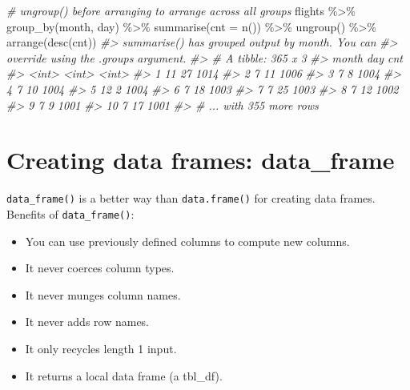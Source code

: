 \documentclass[
]{book}
\newenvironment{Shaded}{\begin{snugshade}}{\end{snugshade}}
\newcommand{\AttributeTok}[1]{\textcolor[rgb]{0.77,0.63,0.00}{#1}}
\newcommand{\CommentTok}[1]{\textcolor[rgb]{0.56,0.35,0.01}{\textit{#1}}}
\newcommand{\FunctionTok}[1]{\textcolor[rgb]{0.00,0.00,0.00}{#1}}
\newcommand{\NormalTok}[1]{#1}
\newcommand{\SpecialCharTok}[1]{\textcolor[rgb]{0.00,0.00,0.00}{#1}}
\providecommand{\tightlist}{%
  \setlength{\itemsep}{0pt}\setlength{\parskip}{0pt}}
\begin{document}
\begin{Shaded}
\begin{Highlighting}[]
\CommentTok{\# ungroup() before arranging to arrange across all groups}
\NormalTok{flights }\SpecialCharTok{\%\textgreater{}\%} \FunctionTok{group\_by}\NormalTok{(month, day) }\SpecialCharTok{\%\textgreater{}\%} \FunctionTok{summarise}\NormalTok{(}\AttributeTok{cnt =} \FunctionTok{n}\NormalTok{()) }\SpecialCharTok{\%\textgreater{}\%} \FunctionTok{ungroup}\NormalTok{() }\SpecialCharTok{\%\textgreater{}\%} \FunctionTok{arrange}\NormalTok{(}\FunctionTok{desc}\NormalTok{(cnt))}
\CommentTok{\#\textgreater{} \textasciigrave{}summarise()\textasciigrave{} has grouped output by \textquotesingle{}month\textquotesingle{}. You can}
\CommentTok{\#\textgreater{} override using the \textasciigrave{}.groups\textasciigrave{} argument.}
\CommentTok{\#\textgreater{} \# A tibble: 365 x 3}
\CommentTok{\#\textgreater{}    month   day   cnt}
\CommentTok{\#\textgreater{}    \textless{}int\textgreater{} \textless{}int\textgreater{} \textless{}int\textgreater{}}
\CommentTok{\#\textgreater{}  1    11    27  1014}
\CommentTok{\#\textgreater{}  2     7    11  1006}
\CommentTok{\#\textgreater{}  3     7     8  1004}
\CommentTok{\#\textgreater{}  4     7    10  1004}
\CommentTok{\#\textgreater{}  5    12     2  1004}
\CommentTok{\#\textgreater{}  6     7    18  1003}
\CommentTok{\#\textgreater{}  7     7    25  1003}
\CommentTok{\#\textgreater{}  8     7    12  1002}
\CommentTok{\#\textgreater{}  9     7     9  1001}
\CommentTok{\#\textgreater{} 10     7    17  1001}
\CommentTok{\#\textgreater{} \# ... with 355 more rows}
\end{Highlighting}
\end{Shaded}

\hypertarget{creating-data-frames-data_frame}{%
\section{Creating data frames: data\_frame}\label{creating-data-frames-data_frame}}

\texttt{data\_frame()} is a better way than \texttt{data.frame()} for creating data frames. Benefits of \texttt{data\_frame()}:

\begin{itemize}
\tightlist
\item
  You can use previously defined columns to compute new columns.
\item
  It never coerces column types.
\item
  It never munges column names.
\item
  It never adds row names.
\item
  It only recycles length 1 input.
\item
  It returns a local data frame (a tbl\_df).
\end{itemize}
\end{document}
